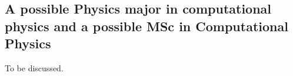 \documentclass[%
oneside,                 %
final,                   %
10pt]{article}
\begin{document}
\noindent
\subsection*{A possible Physics major in computational physics and a possible MSc in Computational Physics}

To be discussed. 

\end{document}
